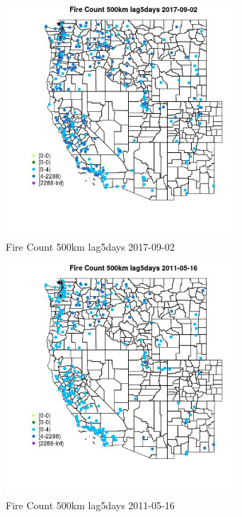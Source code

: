 \begin{figure} 
\centering  
\includegraphics[width=0.77\textwidth]{Code_Outputs/Report_ML_input_PM25_Step4_part_e_de_duplicated_aves_compiled_2019-05-21wNAs_MapObsFire_Count_500km_lag5days2017-09-02.jpg} 
\caption{\label{fig:Report_ML_input_PM25_Step4_part_e_de_duplicated_aves_compiled_2019-05-21wNAsMapObsFire_Count_500km_lag5days2017-09-02}Fire Count 500km lag5days 2017-09-02} 
\end{figure} 
 

\begin{figure} 
\centering  
\includegraphics[width=0.77\textwidth]{Code_Outputs/Report_ML_input_PM25_Step4_part_e_de_duplicated_aves_compiled_2019-05-21wNAs_MapObsFire_Count_500km_lag5days2011-05-16.jpg} 
\caption{\label{fig:Report_ML_input_PM25_Step4_part_e_de_duplicated_aves_compiled_2019-05-21wNAsMapObsFire_Count_500km_lag5days2011-05-16}Fire Count 500km lag5days 2011-05-16} 
\end{figure} 
 

